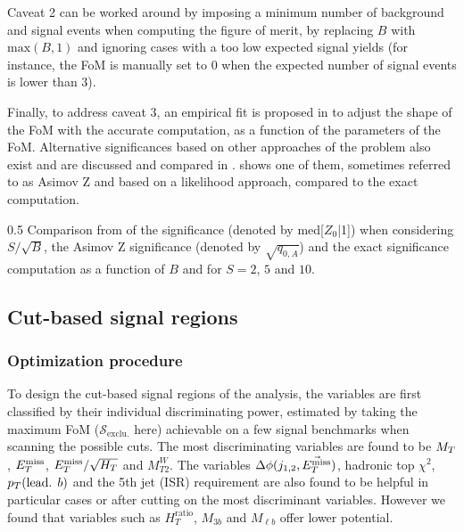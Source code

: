     Caveat 2 can be worked around by imposing a minimum number of background and signal
    events when computing the figure of merit, by replacing $B$ with $\text{max}(B,1)$
    and ignoring cases with a too low expected signal yields (for instance, the FoM is
    manually set to 0 when the expected number of signal events is lower than 3).

    Finally, to address caveat 3, an empirical fit is proposed in \cite{Punzi} to adjust the
    shape of the FoM with the accurate computation, as a function of the parameters
    of the FoM. Alternative significances based on other approaches of the problem also
    exist and are discussed and compared in \cite{FOMCousins, FOMLinnemann, FOMCowan}.
     shows one of them, sometimes referred to as Asimov Z and based on a
    likelihood approach, compared to the exact computation.

                 {0.5}
                 {Comparison from \cite{FOMCowan} of the significance (denoted by med[$Z_0$|1])
                 when considering $S/\sqrt{B}$, the Asimov Z significance (denoted by $\sqrt{q_{0,A}}$) and
                 the exact significance computation as a function of $B$ and for $S = 2$, $5$ and $10$.}

        \subsection{Cut-based signal regions}

            \subsubsection{Optimization procedure}

    To design the cut-based signal regions of the analysis, the variables are first
    classified by their individual discriminating power, estimated by taking the
    maximum FoM ($\mathcal{S}_\text{exclu.}$ here) achievable on a few signal benchmarks when scanning the possible
    cuts. The most discriminating variables are found to be $M_T$, $E_T^\text{miss}$,
    $E_T^\text{miss}/\sqrt{H_T}$ and $M_{T2}^{W}$. The variables $\Delta \phi(j_{1,2},\vec{E_T^\text{miss}})$,
    hadronic top $\chi^2$, $p_T(\text{lead. } b)$ and the 5th jet (ISR) requirement are
    also found to be helpful in particular cases or after cutting on the most discriminant
    variables. However we found that variables such as $H_T^\text{ratio}$, $M_{3b}$ and
    $M_{\ell b}$ offer lower potential.


